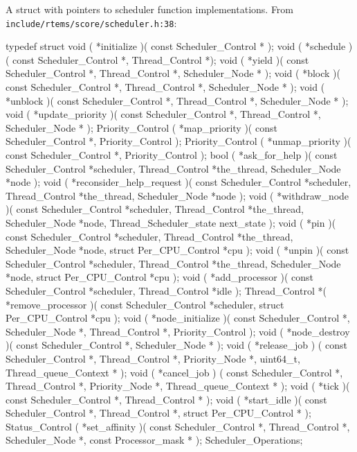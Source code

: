 A struct with pointers to scheduler function implementations.
From \texttt{include/rtems/score/scheduler.h:38}:
\begin{nicec}
typedef struct {
  void ( *initialize )( const Scheduler_Control * );
  void ( *schedule )( const Scheduler_Control *, Thread_Control *);
  void ( *yield )(
    const Scheduler_Control *,
    Thread_Control *,
    Scheduler_Node *
  );
  void ( *block )(
    const Scheduler_Control *,
    Thread_Control *,
    Scheduler_Node *
  );
  void ( *unblock )(
    const Scheduler_Control *,
    Thread_Control *,
    Scheduler_Node *
  );
  void ( *update_priority )(
    const Scheduler_Control *,
    Thread_Control *,
    Scheduler_Node *
  );
  Priority_Control ( *map_priority )(
    const Scheduler_Control *,
    Priority_Control
  );
  Priority_Control ( *unmap_priority )(
    const Scheduler_Control *,
    Priority_Control
  );
  bool ( *ask_for_help )(
    const Scheduler_Control *scheduler,
    Thread_Control          *the_thread,
    Scheduler_Node          *node
  );
  void ( *reconsider_help_request )(
    const Scheduler_Control *scheduler,
    Thread_Control          *the_thread,
    Scheduler_Node          *node
  );
  void ( *withdraw_node )(
    const Scheduler_Control *scheduler,
    Thread_Control          *the_thread,
    Scheduler_Node          *node,
    Thread_Scheduler_state   next_state
  );
  void ( *pin )(
    const Scheduler_Control *scheduler,
    Thread_Control          *the_thread,
    Scheduler_Node          *node,
    struct Per_CPU_Control  *cpu
  );
  void ( *unpin )(
    const Scheduler_Control *scheduler,
    Thread_Control          *the_thread,
    Scheduler_Node          *node,
    struct Per_CPU_Control  *cpu
  );
  void ( *add_processor )(
    const Scheduler_Control *scheduler,
    Thread_Control          *idle
  );
  Thread_Control *( *remove_processor )(
    const Scheduler_Control *scheduler,
    struct Per_CPU_Control  *cpu
  );
  void ( *node_initialize )(
    const Scheduler_Control *,
    Scheduler_Node *,
    Thread_Control *,
    Priority_Control
  );
  void ( *node_destroy )( const Scheduler_Control *, Scheduler_Node * );
  void ( *release_job ) (
    const Scheduler_Control *,
    Thread_Control *,
    Priority_Node *,
    uint64_t,
    Thread_queue_Context *
  );
  void ( *cancel_job ) (
    const Scheduler_Control *,
    Thread_Control *,
    Priority_Node *,
    Thread_queue_Context *
  );
  void ( *tick )( const Scheduler_Control *, Thread_Control * );
  void ( *start_idle )(
    const Scheduler_Control *,
    Thread_Control *,
    struct Per_CPU_Control *
  );
  Status_Control ( *set_affinity )(
    const Scheduler_Control *,
    Thread_Control *,
    Scheduler_Node *,
    const Processor_mask *
  );
} Scheduler_Operations;
\end{nicec}

